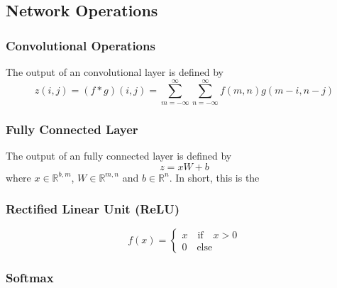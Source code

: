 \subsection*{Network Operations}
\subsubsection*{Convolutional Operations}

The output of an convolutional layer is defined by
\begin{equation}
   z(i,j) = (f*g)(i,j) = \sum_{m=-\infty}^{\infty} \sum_{n=-\infty}^{\infty} f(m,n) g(m-i,n-j)
\end{equation}


\subsubsection*{Fully Connected Layer}

The output of an fully connected layer is defined by
\begin{equation}
	z = xW + b
\end{equation}
where $x \in \mathbb{R}^{b,m}$,  $W \in \mathbb{R}^{m,n}$ and $b \in \mathbb{R}^{n}$. In short, this is the 


\subsubsection*{Rectified Linear Unit (ReLU)}

\begin{equation}
	f(x) = \begin{cases}
		x \quad \text{if} \quad x > 0 \\
		0 \quad \text{else}
	\end{cases}
\end{equation}


\subsubsection*{Softmax}
